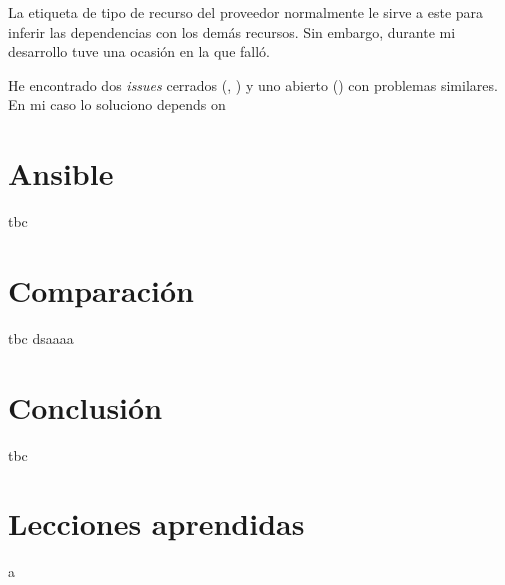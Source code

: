 \documentclass[11pt]{article}
\begin{document}
\begin{flushleft}
	La etiqueta de tipo de recurso del proveedor normalmente le sirve a este para inferir las dependencias con los demás recursos. Sin embargo, durante mi desarrollo tuve una ocasión en la que falló. 

	He encontrado dos \textit{issues} cerrados (\cite{tf_depends3}, \cite{tf_depends2}) y uno abierto (\cite{tf_depends1}) con problemas similares. En mi caso lo soluciono depends on
	

	
	
	
\clearpage
\section{Ansible}
tbc

\section{Comparación}
tbc dsaa\cite{rediscode}aa\cite{knuth-fa}


\section{Conclusión}
tbc

\section{Lecciones aprendidas}

a



\end{flushleft}

\printbibliography
\end{document}
